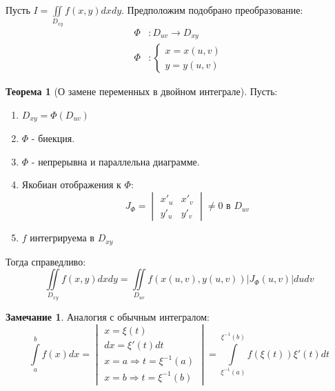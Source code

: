 \documentclass[a4paper, 14pt]{report}
\theoremstyle{definition}
\newtheorem*{note}{Замечание}
\newtheorem*{theorem}{Теорема}
\begin{document}
		Пусть $I=\iint\limits_{D_{xy}}f(x,y)dxdy$. Предположим подобрано преобразование:
	 	\begin{subequations}
	 		\begin{align}
	 			\Phi&:D_{uv}\rightarrow D_{xy} \\
		 		\Phi&:\begin{cases}
		 			x=x(u,v) \\
		 			y=y(u,v)
		 		\end{cases}
	 		\end{align}
	 	\end{subequations}
 	
 	 	\begin{theorem}[О замене переменных в двойном интеграле]
 	 		Пусть:
		 	\begin{enumerate}
				\item $D_{xy}=\Phi(D_{uv})$
		 		\item $\Phi$ - биекция. 
		 		\item $\Phi$ - непрерывна и параллельна диаграмме.
		 		\item Якобиан отображения к $\Phi$:
		 		\begin{equation}
		 			J_\Phi=\begin{vmatrix}
		 				x'_u & x'_v \\
		 				y'_u & y'_v
		 			\end{vmatrix}\ne0\text{ в }D_{uv}
		 		\end{equation}
		 		\item $f$ интегрируема в $D_{xy}$
			\end{enumerate}
		 		
			Тогда справедливо:
			\begin{equation}
				\iint\limits_{D_{xy}}f(x,y)dxdy
				=\iint\limits_{D_{uv}}
					f(x(u,v),y(u,v))
					|J_\Phi(u,v)|
				dudv
			\end{equation}
		\end{theorem}
	
 		\begin{note}
 			Аналогия с обычным интегралом:
 			\begin{equation}
 				\int\limits_a^bf(x)dx=
 				\begin{vmatrix}
 					x=\xi(t) \\
 					dx=\xi'(t)dt \\
 					x=a\Rightarrow t=\xi^{-1}(a) \\
 					x=b\Rightarrow t=\xi^{-1}(b)
 				\end{vmatrix}
					=\int\limits_{\xi^{-1}(a)}^{\xi^{-1}(b)}f(\xi(t))\xi'(t)dt
 			\end{equation}
 		\end{note}
 	
\end{document}
